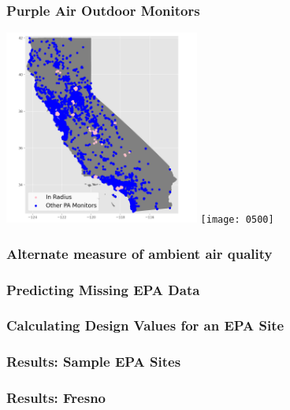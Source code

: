 \documentclass{beamer}
\begin{document}
\begin{frame}
\frametitle{Purple Air Outdoor Monitors}
\includegraphics[width=0.48\textwidth]{output/figures/pa/all_ca_and_15_pa_monitors.png}
\texttt{[image: 0500]}
\end{frame}


\begin{frame}
\frametitle{Alternate measure of ambient air quality}
\end{frame}


\begin{frame}
\frametitle{Predicting Missing EPA Data}
\end{frame}


\begin{frame}
\frametitle{Calculating Design Values for an EPA Site}
\end{frame}


\begin{frame}
\frametitle{Results: Sample EPA Sites}
\end{frame}


\begin{frame}
\frametitle{Results: Fresno}
\end{frame}
\end{document}
